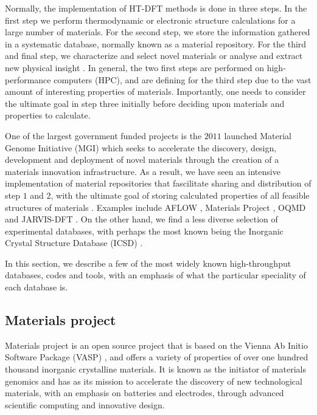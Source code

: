 Normally, the implementation of HT-DFT methods is done in three steps. In the first step we perform thermodynamic or electronic structure calculations for a large number of materials. For the second step, we store the information gathered in a systematic database, normally known as a material repository. For the third and final step, we characterize and select novel materials or analyse and extract new physical insight \cite{Schleder2019}. In general, the two first steps are performed on high-performance computers (HPC), and are defining for the third step due to the vast amount of interesting properties of materials. Importantly, one needs to consider the ultimate goal in step three initially before deciding upon materials and properties to calculate.

One of the largest government funded projects is the $2011$ launched Material Genome Initiative (MGI) \cite{Warren2018} which seeks to accelerate the discovery, design, development and deployment of novel materials through the creation of a materials innovation infrastructure.
As a result, we have seen an intensive implementation of material repositories that fascilitate sharing and distribution of step $1$ and $2$, with the ultimate goal of storing calculated properties of all feasible structures of materials \cite{Schuett2020}.
Examples include AFLOW \cite{Curtarolo2012, Curtarolo2012a, Calderon2015}, Materials Project \cite{Jain2013, Jain2018} , OQMD \cite{Saal2013, Kirklin2015} and JARVIS-DFT \cite{Choudhary2020}.
On the other hand, we find a less diverse selection of experimental databases, with perhaps the most known being the Inorganic Crystal Structure Database (ICSD) \cite{Allen1987}.

In this section, we describe a few of the most widely known high-throughput databases, codes and tools, with an emphasis of what the particular speciality of each database is.

\subsection{Materials project}

Materials project \cite{Jain2013, Jain2018} is an open source project that is based on the Vienna Ab Initio Software Package (VASP) \cite{Kresse1996}, and offers a variety of properties of over one hundred thousand inorganic crystalline materials. It is known as the initiator of materials genomics and has as its mission to accelerate the discovery of new technological materials, with an emphasis on batteries and electrodes, through advanced scientific computing and innovative design.

